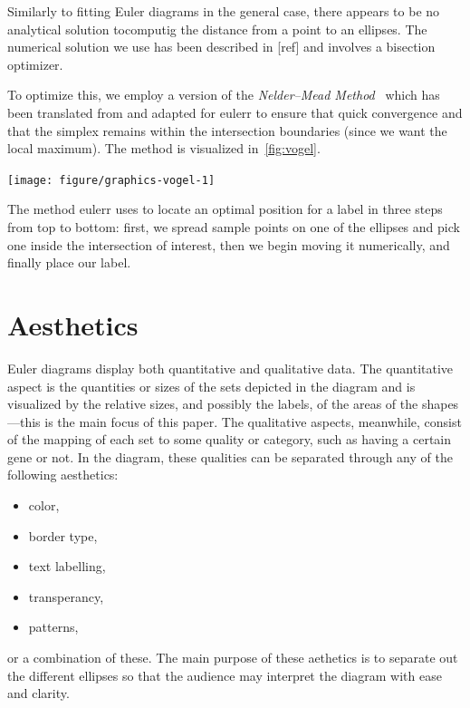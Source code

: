 \documentclass[
  a4paper,
  nofonts,
  nobib,
  nohyper,
  openany
]{tufte-book}\usepackage[]{graphicx}\usepackage[]{color}
\newenvironment{knitrout}{}{} %
\newcommand{\pkg}[1]{{\fontseries{b}\selectfont #1}}
\begin{document}
\begin{appendices}
Similarly to fitting Euler diagrams in the general case, there appears to be no analytical solution tocomputig the distance from a point to an ellipses. The numerical solution we use has been described in [ref] and involves a bisection optimizer.

To optimize this, we employ a version of the \emph{Nelder--Mead Method}~\citep{nelder_1965} which has been translated from \citet{kelley_1999} and adapted for \pkg{eulerr} to ensure that quick convergence and that the simplex remains within the intersection boundaries (since we want the local maximum). The method is visualized in~\cref{fig:vogel}.
\begin{marginfigure}
\begin{knitrout}
\color{fgcolor}

{\centering \texttt{[image: figure/graphics-vogel-1]} 

}



\end{knitrout}
\caption{The method eulerr uses to locate an optimal position for a label in three steps from top to bottom: first, we spread sample points on one of the ellipses and pick one inside the intersection of interest, then we begin moving it numerically, and finally place our label.}
\label{fig:vogel}
\end{marginfigure}

\section{Aesthetics}
\label{sec:aesthetics}

Euler diagrams display both quantitative and qualitative data. The quantitative aspect is the quantities or sizes of the sets depicted in the diagram and is visualized by the relative sizes, and possibly the labels, of the areas of the shapes---this is the main focus of this paper. The qualitative aspects, meanwhile, consist of the mapping of each set to some quality or category, such as having a certain gene or not. In the diagram, these qualities can be separated through any of the following aesthetics:
%
\begin{itemize}
\item color,
\item border type,
\item text labelling,
\item transperancy,
\item patterns,
\end{itemize}
%
or a combination of these. The main purpose of these aethetics is to separate out the different ellipses so that the audience may interpret the diagram with ease and clarity.


\end{appendices}
\end{document}
